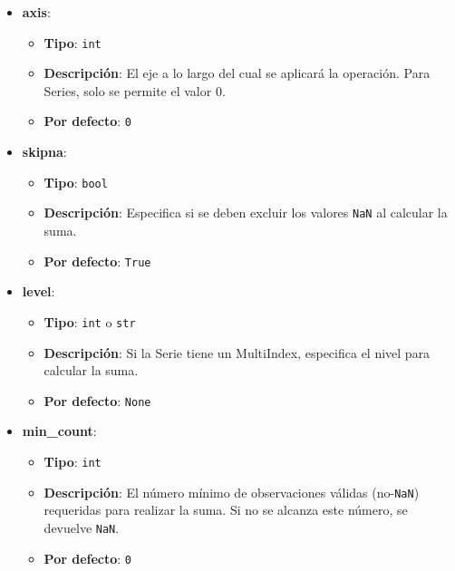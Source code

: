 \begin{itemize}
    \item \textbf{axis}:
          \begin{itemize}
              \item \textbf{Tipo}: \texttt{int}
              \item \textbf{Descripción}: El eje a lo largo del cual se
                    aplicará la operación. Para Series, solo se permite el valor 0.
              \item \textbf{Por defecto}: \texttt{0}
          \end{itemize}

    \item \textbf{skipna}:
          \begin{itemize}
              \item \textbf{Tipo}: \texttt{bool}
              \item \textbf{Descripción}: Especifica si se deben excluir los
                    valores \texttt{NaN} al calcular la suma.
              \item \textbf{Por defecto}: \texttt{True}
          \end{itemize}

    \item \textbf{level}:
          \begin{itemize}
              \item \textbf{Tipo}: \texttt{int} o \texttt{str}
              \item \textbf{Descripción}: Si la Serie tiene un MultiIndex,
                    especifica el nivel para calcular la suma.
              \item \textbf{Por defecto}: \texttt{None}
          \end{itemize}

    \item \textbf{min\_count}:
          \begin{itemize}
              \item \textbf{Tipo}: \texttt{int}
              \item \textbf{Descripción}: El número mínimo de observaciones
                    válidas (no-\texttt{NaN}) requeridas para realizar la suma. Si no se alcanza
                    este número, se devuelve \texttt{NaN}.
              \item \textbf{Por defecto}: \texttt{0}
          \end{itemize}
\end{itemize}

